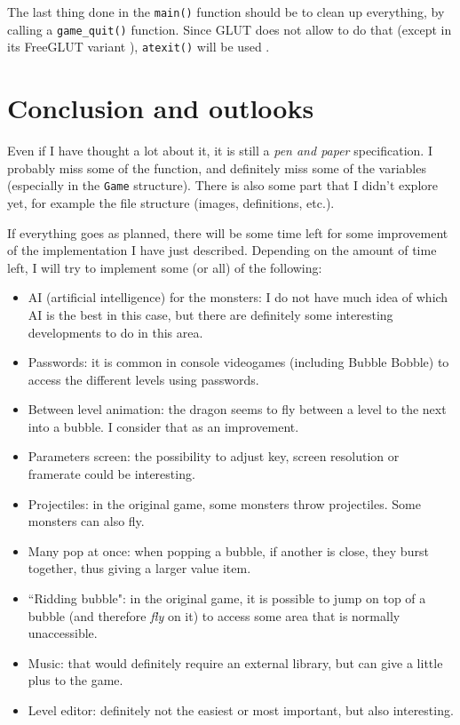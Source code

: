 \documentclass[12pt,a4paper]{article}
\begin{document}
The last thing done in the \texttt{main()} function should be to clean up everything, by calling a \texttt{game_quit()} function. Since GLUT does not allow to do that (except in its FreeGLUT variant \cite{freeglut}), \texttt{atexit()} will be used \cite{cppref}.

\section{Conclusion and outlooks}

Even if I have thought a lot about it, it is still a \textit{pen and paper} specification. I probably miss some of the function, and definitely miss some of the variables (especially in the \texttt{Game} structure). There is also some part that I didn't explore yet, for example the file structure (images, definitions, etc.).

If everything goes as planned, there will be some time left for some improvement of the implementation I have just described. Depending on the amount of time left, I will try to implement some (or all) of the following:\begin{itemize}
\item AI (artificial intelligence) for the monsters: I do not have much idea of which AI is the best in this case, but there are definitely some interesting developments to do in this area.
\item Passwords: it is common in console videogames (including Bubble Bobble) to access the different levels using passwords.
\item Between level animation: the dragon seems to fly between a level to the next into a bubble. I consider that as an improvement.
\item Parameters screen: the possibility to adjust key, screen resolution or framerate could be interesting. 
\item Projectiles: in the original game, some monsters throw projectiles. Some monsters can also fly.
\item Many pop at once: when popping a bubble, if another is close, they burst together, thus giving a larger value item.
\item ``Ridding bubble": in the original game, it is possible to jump on top of a bubble (and therefore \textit{fly} on it) to access some area that is normally unaccessible. 
\item Music: that would definitely require an external library, but can give a little plus to the game.
\item Level editor: definitely not the easiest or most important, but also interesting.
\end{itemize}



\end{document}
